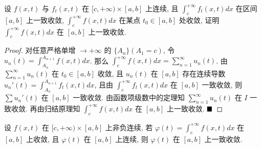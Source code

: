 \documentclass[lang=cn,newtx,10pt,scheme=chinese]{elegantbook}
\begin{document}
\begin{example}
设 $f(x, t)$ 与 $f_t(x, t)$ 在 $[c, +\infty) \times [a, b]$ 上连续, 且 $\int_{c}^{+\infty} f_t(x, t) dx$ 在区间 $[a, b]$ 上一致收敛, $\int_{c}^{+\infty} f(x, t) dx$ 在某点 $t_0 \in [a, b]$ 处收敛, 证明 $\int_{c}^{+\infty} f(x, t) dx$ 在 $[a, b]$ 上一致收敛.
\end{example}

\begin{proof}
对任意严格单增 $\to +\infty$ 的 $\{A_n\} (A_1=c)$, 令 $u_n(t) = \int_{A_n}^{A_{n+1}} f(x,t) dx$.
那么 $\int_{c}^{+\infty} f(x,t) dx = \sum_{n=1}^{\infty} u_n(t)$.
由 $\sum_{n=1}^{\infty} u_n(t)$ 在 $t_0 \in [a, b]$ 收敛, 且 $u_n(t)$ 在 $[a, b]$ 存在连续导数 $u_n'(t) = \int_{A_n}^{A_{n+1}} f_t(x,t) dx$, 且由 $\int_{c}^{+\infty} f_t(x,t) dx$ 在 $[a,b]$ 一致收敛, 则 $\sum u_n'(t)$ 在 $[a,b]$ 一致收敛.
由函数项级数中的定理知 $\sum_{n=1}^{\infty} u_n(t)$ 在 $I$ 一致收敛. 再由归结原理知 $\int_{c}^{+\infty} f(x,t) dx$ 在 $[a,b]$ 上一致收敛.
$\hfill \blacksquare$
\end{proof}

\begin{proposition}[狄尼定理]
设 $f(x, t)$ 在 $[c, +\infty) \times [a, b]$ 上非负连续, 若 $\varphi(t) = \int_{c}^{+\infty} f(x, t) dx$ 在 $[a, b]$ 上收敛, 且 $\varphi(t)$ 在 $[a, b]$ 上连续, 则 $\varphi(t)$ 在 $[a, b]$ 上一致收敛.
\end{proposition}
\end{document}
